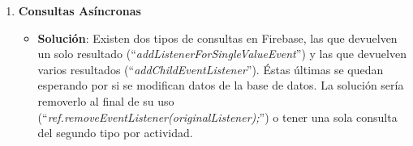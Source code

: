 \begin{enumerate}
		\item {\bf Consultas Asíncronas}
			\begin{itemize}
				\item {\bf Solución}: Existen dos tipos de consultas en Firebase, las que devuelven un solo resultado (``{\it addListenerForSingleValueEvent}'') y las que devuelven varios resultados (``{\it addChildEventListener}''). Éstas últimas se quedan esperando por si se modifican datos de la base de datos.
				La solución sería removerlo al final de su uso (``{\it ref.removeEventListener(originalListener);}'') o tener una sola consulta del segundo tipo por actividad.
			\end{itemize}
	\end{enumerate}